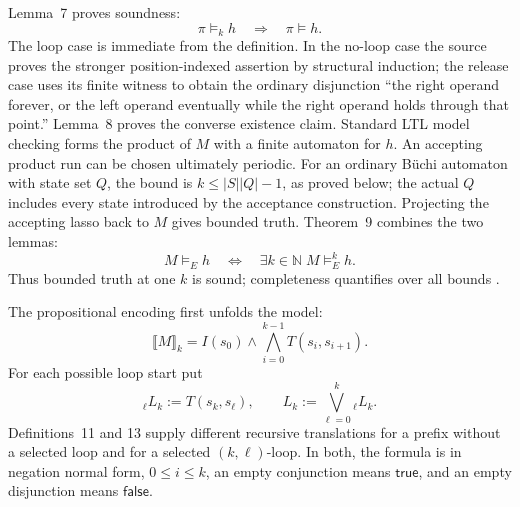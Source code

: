 Lemma~7 proves soundness:
\[
 \pi\models_k h\quad\Longrightarrow\quad\pi\models h.
\]
The loop case is immediate from the definition.  In the no-loop case the
source proves the stronger position-indexed assertion by structural induction;
the release case uses its finite witness to obtain the ordinary disjunction
``the right operand forever, or the left operand eventually while the right
operand holds through that point.''  Lemma~8 proves the converse existence
claim. Standard LTL model checking forms the product of \(M\) with a
finite automaton for \(h\). An accepting product run can be chosen ultimately
periodic. For an ordinary B\"uchi automaton with state set \(Q\), the bound
is \(k\leq |S||Q|-1\), as proved below; the actual \(Q\) includes every
state introduced by the acceptance construction. Projecting the accepting
lasso back to \(M\) gives bounded truth.
Theorem~9 combines the two lemmas:
\[
 M\models_E h
 \quad\Longleftrightarrow\quad
 \exists k\in\mathbb N\;M\models_E^k h.
\]
Thus bounded truth at one \(k\) is sound; completeness quantifies over all
bounds \cite[lems.~7--8 and thm.~9]{BiereCimattiClarkeZhu1999}.

The propositional encoding first unfolds the model:
\[
 \llbracket M\rrbracket_k
 =I(s_0)\land\bigwedge_{i=0}^{k-1}T(s_i,s_{i+1}).
\]
For each possible loop start put
\[
 {}_\ell L_k:=T(s_k,s_\ell),
 \qquad
 L_k:=\bigvee_{\ell=0}^{k}{}_\ell L_k.
\]
Definitions~11 and 13 supply different recursive translations for a prefix
without a selected loop and for a selected \((k,\ell)\)-loop. In both, the
formula is in negation normal form, \(0\leq i\leq k\), an empty conjunction
means \(\mathsf{true}\), and an empty disjunction means \(\mathsf{false}\).

